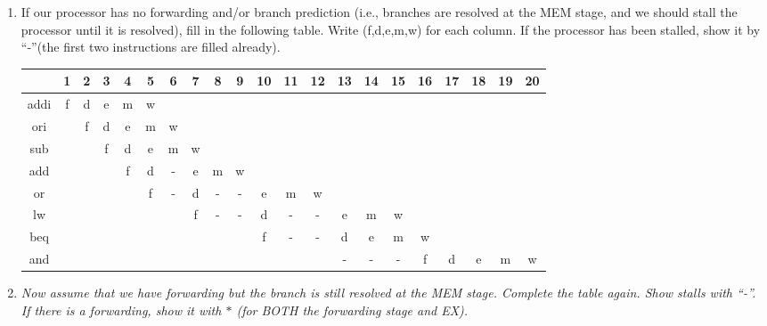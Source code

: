 \documentclass{article}
\begin{document}
\begin{enumerate}[label=(\alph*)]
    \item If our processor has no forwarding and/or branch prediction (i.e., branches are resolved 
        at the MEM stage, and we should stall the processor until it is resolved), fill in the 
        following table. Write (f,d,e,m,w) for each column. If the processor has been stalled, show 
        it by ``-''(the first two instructions are filled already). 

        \begin{table}[ht]
            \centering
            \begin{tabular}{|c|c|c|c|c|c|c|c|c|c|c|c|c|c|c|c|c|c|c|c|c|}
                \hline
                & 1 & 2 & 3 & 4 & 5 & 6 & 7 & 8 & 9 & 10 & 11 & 12 & 13 & 14 & 15 & 16 & 17 & 18 & 19 & 20 \\
                \hline
                addi & f & d & e & m & w & & & & & & & & & & & & & & & \\
                \hline
                ori & & f & d & e & m & w & & & & & & & & & & & & & & \\
                \hline
                sub & & & f & d & e & m & w & & & & & & & & & & & & & \\
                \hline
                add & & & & f & d & - & e & m & w & & & & & & & & & & & \\
                \hline
                or & & & & & f & - & d & - & - & e & m & w & & & & & & & & \\
                \hline
                lw & & & & & & & f & - & - & d & - & - & e & m & w & & & & & \\
                \hline
                beq & & & & & & & & &  & f & - & - & d & e & m & w & & & & \\
                \hline
                and & & & & & & & & & & & & & - & - & - & f & d & e & m & w \\
                \hline
            \end{tabular}
        \end{table}


    \item \textit{Now assume that we have forwarding but the branch is still resolved at the MEM stage. 
            Complete the table again. Show stalls with ``-''. If there is a forwarding, show it with  
        $*$ (for BOTH the forwarding stage and EX).}


\end{enumerate}
\end{document}
